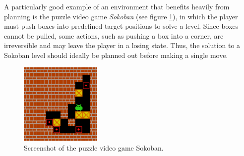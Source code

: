 A particularly good example of an environment that benefits heavily from planning is the puzzle video game \textit{Sokoban} (see figure \ref{fig:sokoban}), in which the player must push boxes into predefined target positions to solve a level. Since boxes cannot be pulled, some actions, such as pushing a box into a corner, are irreversible and may leave the player in a losing state. Thus, the solution to a Sokoban level should ideally be planned out before making a single move.
\begin{figure}[ht]
    \centering
    \includegraphics[width=0.35\textwidth]{assets/sokoban.png}
    \caption{Screenshot of the puzzle video game Sokoban. \cite{sokoban}}
    \label{fig:sokoban}
\end{figure}